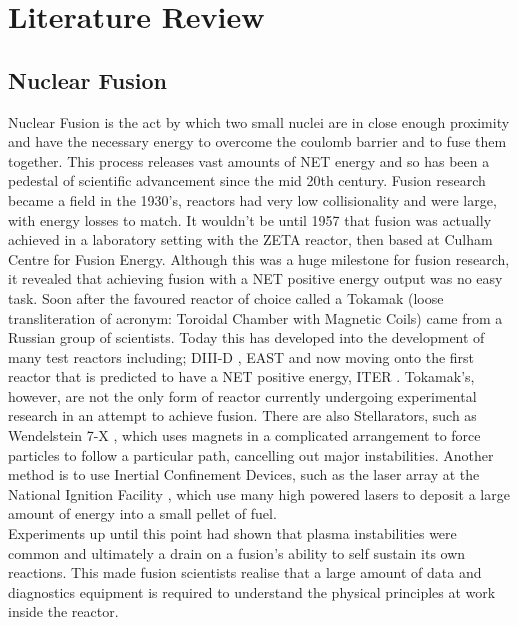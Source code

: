\documentclass[12pt,a4paper,oneside]{report}
\begin{document}

\chapter{Literature Review}
	\section{Nuclear Fusion}
Nuclear Fusion is the act by which two small nuclei are in close enough proximity and have the necessary energy to overcome the coulomb barrier and to fuse them together. This process releases vast amounts of NET energy and so has been a pedestal of scientific advancement since the mid 20th century. Fusion research became a field in the 1930's, reactors had very low collisionality and were large, with energy losses to match. It wouldn't be until 1957 that fusion was actually achieved in a laboratory setting with the ZETA reactor, then based at Culham Centre for Fusion Energy. Although this was a huge milestone for fusion research, it revealed that achieving fusion with a NET positive energy output was no easy task. Soon after the favoured reactor of choice called a Tokamak (loose transliteration of acronym: Toroidal Chamber with Magnetic Coils) came from a Russian group of scientists. Today this has developed into the development of many test reactors including; DIII-D \cite{AymarOverviewExperiment} , EAST \cite{Gao2008DiagnosticsTokamak} and now moving onto the first reactor that is predicted to have a NET positive energy, ITER \cite{Litaudon2017OverviewITER}. Tokamak's, however, are not the only form of reactor currently undergoing experimental research in an attempt to achieve fusion. There are also Stellarators, such as Wendelstein 7-X \cite{Klinger2016Wendelstein7-X}, which uses magnets in a complicated arrangement to force particles to follow a particular path, cancelling out major instabilities. Another method is to use Inertial Confinement Devices, such as the laser array at the National Ignition Facility \cite{Lindl1995DevelopmentGain}, which use many high powered lasers to deposit a large amount of energy into a small pellet of fuel. 
\\
Experiments up until this point had shown that plasma instabilities were common and ultimately a drain on a fusion's ability to self sustain its own reactions. This made fusion scientists realise that a large amount of data and diagnostics equipment is required to understand the physical principles at work inside the reactor.
\pagebreak
\end{document}
